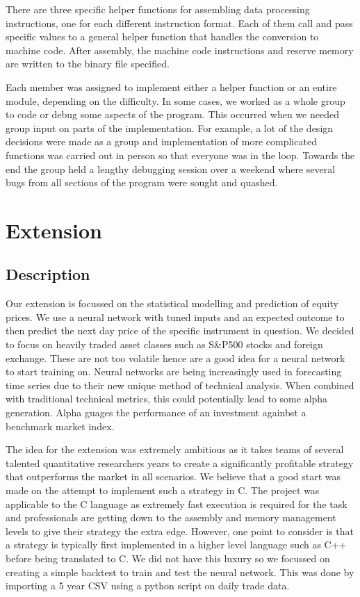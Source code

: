 \documentclass[11pt]{article}
\begin{document}
There are three specific helper functions for assembling data processing instructions,
one for each different instruction format.
Each of them call and pass specific values to a general helper function that handles 
the conversion to machine code. 
After assembly, the machine code instructions and reserve memory are written to the binary file specified.

Each member was assigned to implement either a helper function or an entire module, depending on the difficulty.
In some cases, we worked as a whole group to code or debug some aspects of the program.
This occurred when we needed group input on parts of the implementation. For example, a lot of the design decisions were made as a group and implementation of more complicated functions was carried out in person so that everyone was in the loop. Towards the end the group held a lengthy debugging session over a weekend where several bugs from all sections of the program were sought and quashed. 

\section{Extension}
\subsection{Description}
Our extension is focussed on the statistical modelling and prediction of equity prices. We use a neural network with tuned inputs and an expected outcome to then predict the next day price of the specific instrument in question. We decided to focus on heavily traded asset classes such as S\&P500 stocks and foreign exchange. These are not too volatile hence are a good idea for a neural network to start training on. Neural networks are being increasingly used in forecasting time series due to their new unique method of technical analysis. When combined with traditional technical metrics, this could potentially lead to some alpha generation. Alpha guages the performance of an investment againbst a benchmark market index. 

The idea for the extension was extremely ambitious as it takes teams of several talented quantitative researchers years to create a significantly profitable strategy that outperforms the market in all scenarios. We believe that a good start was made on the attempt to implement such a strategy in C. The project was applicable to the C language as extremely fast execution is required for the task and professionals are getting down to the assembly and memory management levels to give their strategy the extra edge. However, one point to consider is that a strategy is typically first implemented in a higher level language such as C++ before being translated to C. We did not have this luxury so we focussed on creating a simple backtest to train and test the neural network. This was done by importing a 5 year CSV using a python script on daily trade data. 
\end{document}
